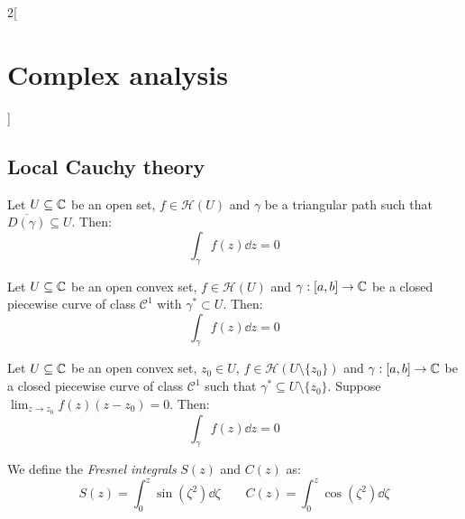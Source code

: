 \documentclass[../../../main.tex]{subfiles}
\begin{document}
\begin{multicols}{2}[\section{Complex analysis}]
  \subsection{Local Cauchy theory}
  \begin{theorem}
    Let $U\subseteq \mathbb{C}$ be an open set, $f\in\mathcal{H}(U)$ and $\gamma$ be a triangular path such that $\overline{D(\gamma)}\subseteq U$. Then: $$\int_\gamma f(z)\dd{z}=0$$
  \end{theorem}
  \begin{theorem}
    Let $U\subseteq \mathbb{C}$ be an open convex set, $f\in\mathcal{H}(U)$ and $\gamma:[a,b]\rightarrow\mathbb{C}$ be a closed piecewise curve of class $\mathcal{C}^1$ with $\gamma^*\subset U$. Then: $$\int_\gamma f(z)\dd{z}=0$$
  \end{theorem}
  \begin{lemma}
    Let $U\subseteq \mathbb{C}$ be an open convex set, $z_0\in U$, $f\in\mathcal{H}(U\setminus\{z_0\})$ and $\gamma:[a,b]\rightarrow\mathbb{C}$ be a closed piecewise curve of class $\mathcal{C}^1$ such that $\gamma^*\subseteq U\setminus\{z_0\}$. Suppose $\displaystyle\lim_{z\to z_0}f(z)(z-z_0)=0$. Then: $$\int_\gamma f(z)\dd{z}=0$$
  \end{lemma}
  \begin{definition}
    We define the \emph{Fresnel integrals} $S(z)$ and $C(z)$ as:
    $$S(z)=\int_0^z\sin(\zeta^2)\dd{\zeta}\qquad C(z)=\int_0^z\cos(\zeta^2)\dd{\zeta}$$
  \end{definition}

\end{multicols}
\end{document}
